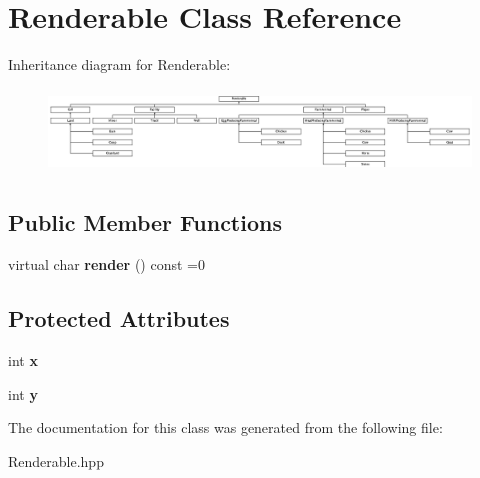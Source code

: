 \hypertarget{class_renderable}{}\section{Renderable Class Reference}
\label{class_renderable}
Inheritance diagram for Renderable\+:\begin{figure}[H]
\begin{center}
\leavevmode
\includegraphics[height=2.265896cm]{class_renderable}
\end{center}
\end{figure}
\subsection*{Public Member Functions}
\begin{DoxyCompactItemize}
\item 
\mbox{\label{class_renderable_af09cff67767ca4645ff24aa6cab84be6}} 
virtual char {\bfseries render} () const =0
\end{DoxyCompactItemize}
\subsection*{Protected Attributes}
\begin{DoxyCompactItemize}
\item 
\mbox{\label{class_renderable_a70fb7e98972efed5489a92006b4b6354}} 
int {\bfseries x}
\item 
\mbox{\label{class_renderable_aea075942b87c751b84ac96174eff5881}} 
int {\bfseries y}
\end{DoxyCompactItemize}


The documentation for this class was generated from the following file\+:\begin{DoxyCompactItemize}
\item 
Renderable.\+hpp\end{DoxyCompactItemize}
